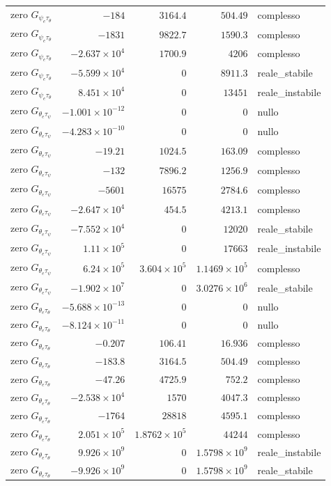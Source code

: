 \documentclass[10pt,a4paper]{article}
\numberwithin{equation}{section}
\begin{document}
\begin{longtable}{lrrrl}
zero $G_{\psi_e\tau_\theta}$ & $-184$ & $3164.4$ & $504.49$ & complesso \\
zero $G_{\psi_e\tau_\theta}$ & $-1831$ & $9822.7$ & $1590.3$ & complesso \\
zero $G_{\psi_e\tau_\theta}$ & $-2.637\times10^{4}$ & $1700.9$ & $4206$ & complesso \\
zero $G_{\psi_e\tau_\theta}$ & $-5.599\times10^{4}$ & $0$ & $8911.3$ & reale\_stabile \\
zero $G_{\psi_e\tau_\theta}$ & $8.451\times10^{4}$ & $0$ & $13451$ & reale\_instabile \\
\midrule
zero $G_{\theta_e\tau_\psi}$ & $-1.001\times10^{-12}$ & $0$ & $0$ & nullo \\
zero $G_{\theta_e\tau_\psi}$ & $-4.283\times10^{-10}$ & $0$ & $0$ & nullo \\
zero $G_{\theta_e\tau_\psi}$ & $-19.21$ & $1024.5$ & $163.09$ & complesso \\
zero $G_{\theta_e\tau_\psi}$ & $-132$ & $7896.2$ & $1256.9$ & complesso \\
zero $G_{\theta_e\tau_\psi}$ & $-5601$ & $16575$ & $2784.6$ & complesso \\
zero $G_{\theta_e\tau_\psi}$ & $-2.647\times10^{4}$ & $454.5$ & $4213.1$ & complesso \\
zero $G_{\theta_e\tau_\psi}$ & $-7.552\times10^{4}$ & $0$ & $12020$ & reale\_stabile \\
zero $G_{\theta_e\tau_\psi}$ & $1.11\times10^{5}$ & $0$ & $17663$ & reale\_instabile \\
zero $G_{\theta_e\tau_\psi}$ & $6.24\times10^{5}$ & $3.604\times10^{5}$ & $1.1469\times10^{5}$ & complesso \\
zero $G_{\theta_e\tau_\psi}$ & $-1.902\times10^{7}$ & $0$ & $3.0276\times10^{6}$ & reale\_stabile \\
\midrule
zero $G_{\theta_e\tau_\theta}$ & $-5.688\times10^{-13}$ & $0$ & $0$ & nullo \\
zero $G_{\theta_e\tau_\theta}$ & $-8.124\times10^{-11}$ & $0$ & $0$ & nullo \\
zero $G_{\theta_e\tau_\theta}$ & $-0.207$ & $106.41$ & $16.936$ & complesso \\
zero $G_{\theta_e\tau_\theta}$ & $-183.8$ & $3164.5$ & $504.49$ & complesso \\
zero $G_{\theta_e\tau_\theta}$ & $-47.26$ & $4725.9$ & $752.2$ & complesso \\
zero $G_{\theta_e\tau_\theta}$ & $-2.538\times10^{4}$ & $1570$ & $4047.3$ & complesso \\
zero $G_{\theta_e\tau_\theta}$ & $-1764$ & $28818$ & $4595.1$ & complesso \\
zero $G_{\theta_e\tau_\theta}$ & $2.051\times10^{5}$ & $1.8762\times10^{5}$ & $44244$ & complesso \\
zero $G_{\theta_e\tau_\theta}$ & $9.926\times10^{9}$ & $0$ & $1.5798\times10^{9}$ & reale\_instabile \\
zero $G_{\theta_e\tau_\theta}$ & $-9.926\times10^{9}$ & $0$ & $1.5798\times10^{9}$ & reale\_stabile \\
\bottomrule\end{longtable}
\end{document}
